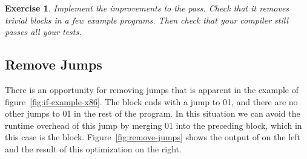 \documentclass[7x10]{TimesAPriori_MIT}%
\def\racketEd{0}
\def\pythonEd{1}
\def\edition{1}
\newcommand{\racket}[1]{{\if\edition\racketEd{#1}\fi}}
\newcommand{\pythonColor}[0]{}
\newcommand{\python}[1]{{\if\edition\pythonEd\pythonColor #1\fi}}
\newtheorem{exercise}[theorem]{Exercise}
\numberwithin{theorem}{chapter}
\numberwithin{definition}{chapter}
\numberwithin{equation}{chapter}
\begin{document}



\begin{exercise}\normalfont\normalsize
  Implement the improvements to the  pass.
  Check that it removes trivial blocks in a few example programs. Then
  check that your compiler still passes all your tests.
\end{exercise}


\subsection{Remove Jumps}

There is an opportunity for removing jumps that is apparent in the
example of figure~\ref{fig:if-example-x86}. The  block
ends with a jump to \racket{}\python{},
and there are no other jumps to
\racket{}\python{} in the rest of the program.
In this situation we can avoid the runtime overhead of this jump by merging
\racket{}\python{}
into the preceding block, which in this case is the  block.
Figure~\ref{fig:remove-jumps} shows the output of
 on the left and the result of this
optimization on the right.
\end{document}
